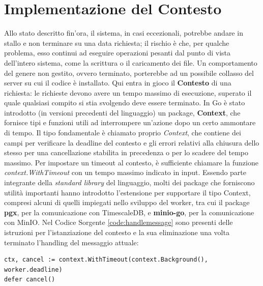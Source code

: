 \section{Implementazione del Contesto} \label{contesto}
Allo stato descritto fin'ora, il sistema, in casi eccezionali, potrebbe andare in stallo e non terminare su una data richiesta; il rischio è che, per qualche problema, esso continui ad eseguire operazioni pesanti dal punto di vista dell'intero sistema, come la scrittura o il caricamento dei file. Un comportamento del genere non gestito, ovvero terminato, porterebbe ad un possibile collasso del server su cui il codice è installato. Qui entra in gioco il \textbf{Contesto} di una richiesta: le richieste devono avere un tempo massimo di esecuzione, superato il quale qualsiasi compito si stia svolgendo deve essere terminato. In Go è stato introdotto (in versioni precedenti del linguaggio) un package, \textbf{Context}, che fornisce tipi e funzioni utili ad interrompere un'azione dopo un certo ammontare di tempo. Il tipo fondamentale è chiamato proprio \textit{Context}, che contiene dei campi per verificare la deadline del contesto e gli errori relativi alla chiusura dello stesso per una cancellazione stabilita in precedenza o per lo scadere del tempo massimo. Per impostare un timeout al contesto, è sufficiente chiamare la funzione \textit{context.WithTimeout} con un tempo massimo indicato in input. Essendo parte integrante della \textit{standard library} del linguaggio, molti dei package che forniscono utilità importanti hanno introdotto l'estensione per supportare il tipo Context, compresi alcuni di quelli impiegati nello sviluppo del worker, tra cui il package \textbf{pgx}, per la comunicazione con TimescaleDB, e \textbf{minio-go}, per la comunicazione con MinIO. Nel Codice Sorgente \ref{code:handlemessage} sono presenti delle istruzioni per l'istanziazione del contesto e la sua eliminazione una volta terminato l'handling del messaggio attuale:
\begin{verbatim}
ctx, cancel := context.WithTimeout(context.Background(), worker.deadline)
defer cancel()
\end{verbatim}
